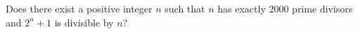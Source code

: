 Does there exist a positive integer $n$ such that $n$ has exactly $2000$ prime divisors and $2^n + 1$ is divisible by $n$?
